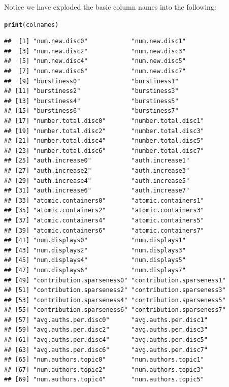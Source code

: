 \documentclass{article}\usepackage[]{graphicx}\usepackage[]{color}
\makeatletter
\newcommand{\hlstd}[1]{\textcolor[rgb]{0.345,0.345,0.345}{#1}}%
\newcommand{\hlkwd}[1]{\textcolor[rgb]{0.737,0.353,0.396}{\textbf{#1}}}%
\newenvironment{kframe}{%
 \def\at@end@of@kframe{}%
 \ifinner\ifhmode%
  \def\at@end@of@kframe{\end{minipage}}%
  \begin{minipage}{\columnwidth}%
 \fi\fi%
 \def\FrameCommand##1{\hskip\@totalleftmargin \hskip-\fboxsep
 \colorbox{shadecolor}{##1}\hskip-\fboxsep
     \hskip-\linewidth \hskip-\@totalleftmargin \hskip\columnwidth}%
 \MakeFramed {\advance\hsize-\width
   \@totalleftmargin\z@ \linewidth\hsize
   \@setminipage}}%
 {\par\unskip\endMakeFramed%
 \at@end@of@kframe}
\newenvironment{knitrout}{}{} %
\makeatother
\begin{document}
Notice we have exploded the basic column names into the following:
\begin{knitrout}
\color{fgcolor}\begin{kframe}
\begin{alltt}
\hlkwd{print}\hlstd{(colnames)}
\end{alltt}
\begin{verbatim}
##  [1] "num.new.disc0"            "num.new.disc1"           
##  [3] "num.new.disc2"            "num.new.disc3"           
##  [5] "num.new.disc4"            "num.new.disc5"           
##  [7] "num.new.disc6"            "num.new.disc7"           
##  [9] "burstiness0"              "burstiness1"             
## [11] "burstiness2"              "burstiness3"             
## [13] "burstiness4"              "burstiness5"             
## [15] "burstiness6"              "burstiness7"             
## [17] "number.total.disc0"       "number.total.disc1"      
## [19] "number.total.disc2"       "number.total.disc3"      
## [21] "number.total.disc4"       "number.total.disc5"      
## [23] "number.total.disc6"       "number.total.disc7"      
## [25] "auth.increase0"           "auth.increase1"          
## [27] "auth.increase2"           "auth.increase3"          
## [29] "auth.increase4"           "auth.increase5"          
## [31] "auth.increase6"           "auth.increase7"          
## [33] "atomic.containers0"       "atomic.containers1"      
## [35] "atomic.containers2"       "atomic.containers3"      
## [37] "atomic.containers4"       "atomic.containers5"      
## [39] "atomic.containers6"       "atomic.containers7"      
## [41] "num.displays0"            "num.displays1"           
## [43] "num.displays2"            "num.displays3"           
## [45] "num.displays4"            "num.displays5"           
## [47] "num.displays6"            "num.displays7"           
## [49] "contribution.sparseness0" "contribution.sparseness1"
## [51] "contribution.sparseness2" "contribution.sparseness3"
## [53] "contribution.sparseness4" "contribution.sparseness5"
## [55] "contribution.sparseness6" "contribution.sparseness7"
## [57] "avg.auths.per.disc0"      "avg.auths.per.disc1"     
## [59] "avg.auths.per.disc2"      "avg.auths.per.disc3"     
## [61] "avg.auths.per.disc4"      "avg.auths.per.disc5"     
## [63] "avg.auths.per.disc6"      "avg.auths.per.disc7"     
## [65] "num.authors.topic0"       "num.authors.topic1"      
## [67] "num.authors.topic2"       "num.authors.topic3"      
## [69] "num.authors.topic4"       "num.authors.topic5"      

\end{verbatim}
\end{kframe}
\end{knitrout}
\end{document}
